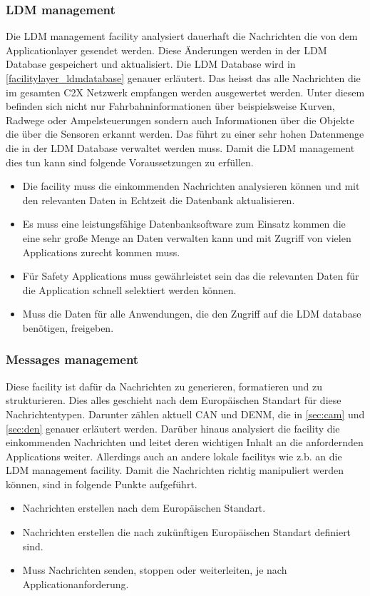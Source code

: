 \subsubsection{LDM management \label{facilitylayer_LDMManagement}}
Die \ac{LDM} management facility analysiert dauerhaft die Nachrichten die von dem Applicationlayer gesendet werden. Diese Änderungen werden in der \ac{LDM} Database gespeichert und aktualisiert. Die LDM Database wird in \autoref{facilitylayer_ldmdatabase} genauer erläutert. Das heisst das alle Nachrichten die im gesamten \ac{C2X} Netzwerk empfangen werden ausgewertet werden. Unter diesem befinden sich nicht nur Fahrbahninformationen über beispielsweise Kurven, Radwege oder Ampelsteuerungen sondern auch Informationen über die Objekte die über die Sensoren erkannt werden. Das führt zu einer sehr hohen Datenmenge die in der \ac{LDM} Database verwaltet werden muss. Damit die \ac{LDM} management dies tun kann sind folgende Voraussetzungen zu erfüllen.
\begin{itemize}
\item Die facility muss die einkommenden Nachrichten analysieren können und mit den relevanten Daten in Echtzeit die Datenbank aktualisieren.
\item Es muss eine leistungsfähige Datenbanksoftware zum Einsatz kommen die eine sehr große Menge an Daten verwalten kann und mit Zugriff von vielen Applications zurecht kommen muss.
\item Für Safety Applications muss gewährleistet sein das die relevanten Daten für die Application schnell selektiert werden können.
\item Muss die Daten für alle Anwendungen, die den Zugriff auf die LDM database benötigen, freigeben.
\end{itemize}

\subsubsection{Messages management \label{facilitylayer_MessagesManagement}}
Diese facility ist dafür da Nachrichten zu generieren, formatieren und zu strukturieren. Dies alles geschieht nach dem Europäischen Standart für diese Nachrichtentypen. Darunter zählen aktuell CAN und DENM, die in \autoref{sec:cam} und \autoref{sec:den} genauer erläutert werden. Darüber hinaus analysiert die facility die einkommenden Nachrichten und leitet deren wichtigen Inhalt an die anfordernden Applications weiter. Allerdings auch an andere lokale facilitys wie z.b. an die LDM management facility. Damit die Nachrichten richtig manipuliert werden können, sind in \cite{etsi102638} folgende Punkte aufgeführt.
\begin{itemize}
\item Nachrichten erstellen nach dem Europäischen Standart. 
\item Nachrichten erstellen die nach zukünftigen Europäischen Standart definiert sind.
\item Muss Nachrichten senden, stoppen oder weiterleiten, je nach Applicationanforderung.
\end{itemize}

